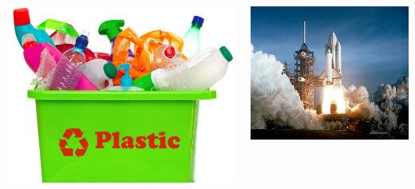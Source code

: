 \documentclass[xcolor=table,serif,handout]{beamer}
\begin{document}
\begin{frame}
\begin{columns}
	\centerline{\includegraphics[scale=0.05]{plastic.jpg}}

	\centerline{\includegraphics[scale=0.5]{space_age.jpg}}	


\end{columns}
\end{frame}
\end{document}
